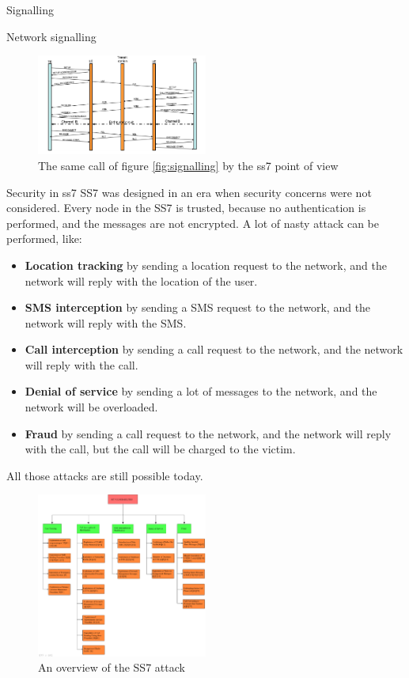 \begin{section}{Signalling}
\begin{subsection}{Network signalling}
    \begin{figure}[h]
      \centering
      \includegraphics[width=0.5\textwidth]{img/wireless/ss7 digital call.png}
      \caption{The same call of figure \ref{fig:signalling} by the ss7 point of view}
      \label{fig:ss7-call}
    \end{figure}
    \begin{subsubsection}{Security in ss7}
      SS7 was designed in an era when security concerns were not considered. Every node in the SS7
      is trusted, because no authentication is performed, and the messages are not encrypted. 
      A lot of nasty attack can be performed, like:
      \begin{itemize}
        \item \textbf{Location tracking} by sending a location request to the network, and the
          network will reply with the location of the user.
        \item \textbf{SMS interception} by sending a SMS request to the network, and the network will
          reply with the SMS.
        \item \textbf{Call interception} by sending a call request to the network, and the network
          will reply with the call.
        \item \textbf{Denial of service} by sending a lot of messages to the network, and the network
          will be overloaded.
        \item \textbf{Fraud} by sending a call request to the network, and the network will reply
          with the call, but the call will be charged to the victim.
      \end{itemize}
      All those attacks are still possible today.
      \begin{figure}[h]
        \centering
        \includegraphics[width=0.5\textwidth]{img/wireless/ss7 attacks.png}
        \caption{An overview of the SS7 attack}
        \label{fig:ss7-attack}
      \end{figure}
    \end{subsubsection}
  \end{subsection}
\end{section}


